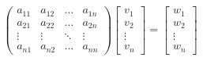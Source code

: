 \documentclass[15pt, a4paper]{article}
\begin{document}
    \begin{equation*}
        \begin{pmatrix}
            a_{11} & a_{12} & \dots  & a_{1n} \\
            a_{21} & a_{22} & \dots  & a_{2n} \\
            \vdots & \vdots & \ddots & \vdots \\
            a_{n1} & a_{n2} & \dots  & a_{nn}
        \end{pmatrix}
        \begin{bmatrix}
            v_{1} \\
            v_{2} \\
            \vdots \\
            v_{n}
        \end{bmatrix}
        =
        \begin{bmatrix}
            w_{1} \\
            w_{2} \\
            \vdots \\
            w_{n}
        \end{bmatrix}
    \end{equation*}
\end{document}
